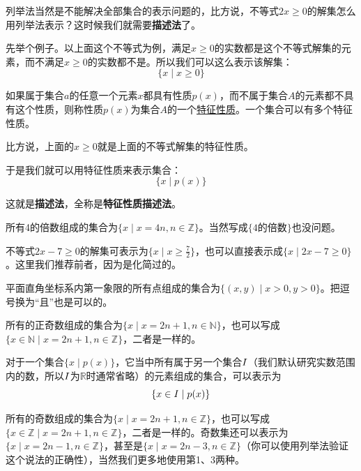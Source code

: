 \documentclass[lang=cn,math=cm,chinesefont=nofont,11pt,scheme=chinese,twocol]{elegantbook}
\begin{document}
列举法当然是不能解决全部集合的表示问题的，比方说，不等式$2x\geq 0$的解集怎么用列举法表示？这时候我们就需要\textbf{描述法}了。

先举个例子。以上面这个不等式为例，满足$x\geq 0$的实数都是这个不等式解集的元素，而不满足$x\geq 0$的实数都不是。所以我们可以这么表示该解集：
$$\{x\mid x\geq0\}$$

\begin{definition}[特征性质]
如果属于集合$a$的任意一个元素$x$都具有性质$p(x)$，而不属于集合$A$的元素都不具有这个性质，则称性质$p(x)$为集合$A$的一个\underline{特征性质}。一个集合可以有多个特征性质。
\end{definition}
比方说，上面的$x\geq 0$就是上面的不等式解集的特征性质。

于是我们就可以用特征性质来表示集合：$$\{x\mid p(x)\}$$

这就是\textbf{描述法}，全称是\textbf{特征性质描述法}。

\begin{example}
  所有4的倍数组成的集合为$\{x\mid x=4n,n\in\mathbb{Z}\}$。当然写成$\{\text{4的倍数}\}$也没问题。
\end{example}

\begin{example}
  不等式$2x-7\geq 0$的解集可表示为$\{x\mid x\geq\frac{7}{2}\}$，也可以直接表示成$\{x\mid 2x-7\geq 0\}$。这里我们推荐前者，因为是化简过的。
\end{example}

\begin{example}
  平面直角坐标系内第一象限的所有点组成的集合为$\{(x,y)\mid x>0,y>0\}$。把逗号换为“且”也是可以的。
\end{example}

\begin{example}
  所有的正奇数组成的集合为$\{x\mid x=2n+1,n\in\mathbb{N}\}$，也可以写成$\{x\in\mathbb{N}\mid x=2n+1,n\in\mathbb{Z}\}$，二者是一样的。
\end{example}

\begin{remark}
  对于一个集合$\{x\mid p(x)\}$，它当中所有属于另一个集合$\boldmath{I}$（我们默认研究实数范围内的数，所以$\boldmath{I}$为$\mathbb{R}$时通常省略）的元素组成的集合，可以表示为$$\{x\in\boldmath{I}\mid p(x)\}$$
\end{remark}

\begin{example}
  \label{exp:1}
  所有的奇数组成的集合为$\{x\mid x=2n+1,n\in\mathbb{Z}\}$，也可以写成$\{x\in\mathbb{Z}\mid x=2n+1,n\in\mathbb{Z}\}$，二者是一样的。奇数集还可以表示为$\{x\mid x=2n-1,n\in\mathbb{Z}\}$，甚至是$\{x\mid x=2n-3,n\in\mathbb{Z}\}$（你可以使用列举法验证这个说法的正确性），当然我们更多地使用第1、3两种。
\end{example}
\end{document}
